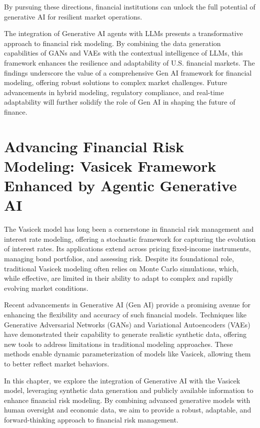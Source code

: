 \documentclass[a4paper,12pt]{scrbook}
\begin{document}
	By pursuing these directions, financial institutions can unlock the full potential of generative AI for resilient market operations.
	
	
	The integration of Generative AI agents with LLMs presents a transformative approach to financial risk modeling. By combining the data generation capabilities of GANs and VAEs with the contextual intelligence of LLMs, this framework enhances the resilience and adaptability of U.S. financial markets. The findings underscore the value of a comprehensive Gen AI framework for financial modeling, offering robust solutions to complex market challenges. Future advancements in hybrid modeling, regulatory compliance, and real-time adaptability will further solidify the role of Gen AI in shaping the future of finance.
	
	
	
	\chapter{Advancing Financial Risk Modeling: Vasicek Framework Enhanced by Agentic Generative AI}
	
	
	The Vasicek model has long been a cornerstone in financial risk management and interest rate modeling, offering a stochastic framework for capturing the evolution of interest rates. Its applications extend across pricing fixed-income instruments, managing bond portfolios, and assessing risk. Despite its foundational role, traditional Vasicek modeling often relies on Monte Carlo simulations, which, while effective, are limited in their ability to adapt to complex and rapidly evolving market conditions.
	
	Recent advancements in Generative AI (Gen AI) provide a promising avenue for enhancing the flexibility and accuracy of such financial models. Techniques like Generative Adversarial Networks (GANs) and Variational Autoencoders (VAEs) have demonstrated their capability to generate realistic synthetic data, offering new tools to address limitations in traditional modeling approaches. These methods enable dynamic parameterization of models like Vasicek, allowing them to better reflect market behaviors.
	
	In this chapter, we explore the integration of Generative AI with the Vasicek model, leveraging synthetic data generation and publicly available information to enhance financial risk modeling. By combining advanced generative models with human oversight and economic data, we aim to provide a robust, adaptable, and forward-thinking approach to financial risk management.
	
\end{document}
